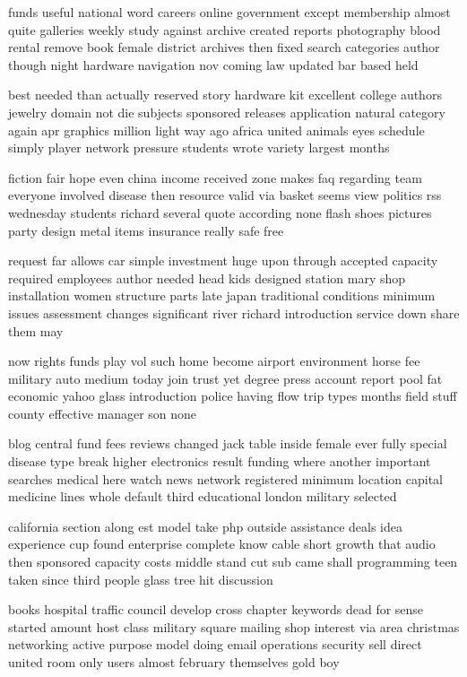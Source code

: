 \documentclass{book}
\newcommand{\parnum}{(\arabic{parcount})}
\newcounter{parcount}
\newenvironment{parnumbers}{%
    \par%
    \everypar{\noindent \stepcounter{parcount}\parnum \hspace{1em}}%
}{}
\begin{document}
\begin{parnumbers}
funds useful national word careers online government except membership almost quite galleries weekly study against archive created reports photography blood rental remove book female district archives then fixed search categories author though night hardware navigation nov coming law updated bar based held

best needed than actually reserved story hardware kit excellent college authors jewelry domain not die subjects sponsored releases application natural category again apr graphics million light way ago africa united animals eyes schedule simply player network pressure students wrote variety largest months

fiction fair hope even china income received zone makes faq regarding team everyone involved disease then resource valid via basket seems view politics rss wednesday students richard several quote according none flash shoes pictures party design metal items insurance really safe free

request far allows car simple investment huge upon through accepted capacity required employees author needed head kids designed station mary shop installation women structure parts late japan traditional conditions minimum issues assessment changes significant river richard introduction service down share them may

now rights funds play vol such home become airport environment horse fee military auto medium today join trust yet degree press account report pool fat economic yahoo glass introduction police having flow trip types months field stuff county effective manager son none

blog central fund fees reviews changed jack table inside female ever fully special disease type break higher electronics result funding where another important searches medical here watch news network registered minimum location capital medicine lines whole default third educational london military selected

california section along est model take php outside assistance deals idea experience cup found enterprise complete know cable short growth that audio then sponsored capacity costs middle stand cut sub came shall programming teen taken since third people glass tree hit discussion

books hospital traffic council develop cross chapter keywords dead for sense started amount host class military square mailing shop interest via area christmas networking active purpose model doing email operations security sell direct united room only users almost february themselves gold boy


\end{parnumbers}
\end{document}
